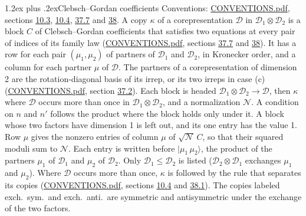 \documentclass[10pt,a4paper]{article}
\makeatletter
\renewcommand\section{\@startsection{section}{1}{\z@}{-3ex plus -1ex minus -.2ex}%
  {1.2ex plus .2ex}{\normalfont\large\sffamily\bfseries\color{parttitle}}}
\numberwithin{equation}{section}
\newcommand{\irrprod}{\otimes}
\newcommand{\mult}{\kappa}
\newcommand{\intx}{\mu}
\newcommand{\cgnorm}{\mathcal{N}}
\newcommand{\prodket}[2]{\lvert {#1}\,{#2}\rangle}
\makeatother
\begin{document}
\section{Clebsch--Gordan coefficients}\label{s:clebsch_gordan}
Conventions: \href{../../CONVENTIONS.pdf}{CONVENTIONS.pdf}, sections \href{../../../rotation/CONVENTIONS.pdf\#conv.10.3}{10.3}, \href{../../../rotation/CONVENTIONS.pdf\#conv.10.4}{10.4}, \href{../../CONVENTIONS.pdf\#conv.37.7}{37.7} and \href{../../CONVENTIONS.pdf\#conv.38}{38}.
\leavevmode\label{n:matrix.corep.factors}\label{n:index.copy}\label{n:matrix.cg.stored}A copy $\mult$ of a corepresentation $\mathcal{D}$ in $\mathcal{D}_1\irrprod\mathcal{D}_2$ is a block $C$ of Clebsch--Gordan coefficients that satisfies two equations at every pair of indices of its family law (\href{../../CONVENTIONS.pdf}{CONVENTIONS.pdf}, sections \href{../../CONVENTIONS.pdf\#conv.37.7}{37.7} and \href{../../CONVENTIONS.pdf\#conv.38}{38}). \label{n:index.cg}It has a row for each pair $(\intx_1, \intx_2)$ of partners of $\mathcal{D}_1$ and $\mathcal{D}_2$, in Kronecker order, and a column for each partner $\intx$ of $\mathcal{D}$.
The partners of a corepresentation of dimension 2 are the rotation-diagonal basis of its irrep, or its two irreps in case (c) (\href{../../CONVENTIONS.pdf}{CONVENTIONS.pdf}, section \href{../../CONVENTIONS.pdf\#conv.37.2}{37.2}).
Each block is headed $\mathcal{D}_1\irrprod\mathcal{D}_2\to\mathcal{D}$, then $\mult$ where $\mathcal{D}$ occurs more than once in $\mathcal{D}_1\irrprod\mathcal{D}_2$, and a normalization $\cgnorm$. A condition on $n$ and $n'$ follows the product where the block holds only under it. A block whose two factors have dimension 1 is left out, and its one entry has the value 1. Row $\intx$ gives the nonzero entries of column $\intx$ of $\sqrt{\cgnorm}\,C$, so that their squared moduli sum to $\cgnorm$. \label{n:vector.ket.product}Each entry is written before $\prodket{\intx_1}{\intx_2}$, the product of the partners $\intx_1$ of $\mathcal{D}_1$ and $\intx_2$ of $\mathcal{D}_2$. Only $\mathcal{D}_1 \le \mathcal{D}_2$ is listed ($\mathcal{D}_2\irrprod\mathcal{D}_1$ exchanges $\intx_1$ and $\intx_2$).
Where $\mathcal{D}$ occurs more than once, $\mult$ is followed by the rule that separates its copies (\href{../../CONVENTIONS.pdf}{CONVENTIONS.pdf}, sections \href{../../../rotation/CONVENTIONS.pdf\#conv.10.4}{10.4} and \href{../../CONVENTIONS.pdf\#conv.38.1}{38.1}). \label{n:abbreviation.exchange}The copies labeled exch.\ sym.\ and exch.\ anti.\ are symmetric and antisymmetric under the exchange of the two factors.
\end{document}
